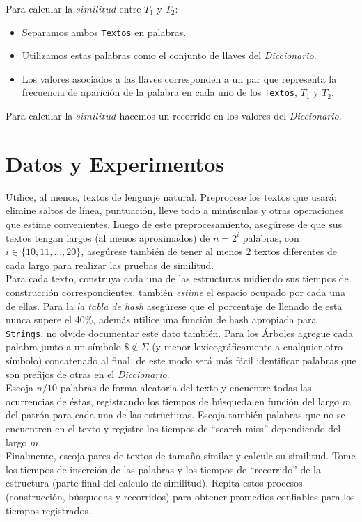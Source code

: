 \documentclass[dcc,uchile]{fcfmcourse}
\begin{document}
Para calcular la $similitud$ entre $T_{1}$ y $T_{2}$:
\begin{itemize}
\item Separamos ambos \texttt{Textos} en palabras.
\item Utilizamos estas palabras como el conjunto de llaves del \textit{Diccionario}.
\item Los valores asociados a las llaves corresponden a un par que representa la frecuencia de aparición de la palabra en cada uno de los \texttt{Textos}, $T_{1}$ y $T_{2}$.
\end{itemize}
Para calcular la $similitud$ hacemos un recorrido en los valores del \textit{Diccionario}.
\section{Datos y Experimentos}
Utilice, al menos, textos de lenguaje natural. Preprocese los textos que usará: elimine saltos de línea, puntuación, lleve todo a minúsculas y otras operaciones que estime convenientes. Luego de este preprocesamiento, asegúrese de que sus textos tengan largos (al menos aproximados) de $n = 2^i$ palabras, con $i \in \{10, 11, \ldots, 20\}$, asegúrese también de tener al menos $2$ textos diferentes de cada largo para realizar las pruebas de similitud.\\
Para cada texto, construya cada una de las estructuras midiendo sus tiempos de construcción correspondientes, también \textit{estime} el espacio ocupado por cada una de ellas. Para la \textit{la tabla de hash} asegúrese que el porcentaje de llenado de esta nunca supere el 40\%, además utilice una función de hash apropiada para \texttt{Strings}, no olvide documentar este dato también. Para los Árboles agregue cada palabra junto a un símbolo $\$ \not \in \Sigma$ (y menor lexicográficamente a cualquier otro símbolo) concatenado al final, de este modo será más fácil identificar palabras que son prefijos de otras en el \textit{Diccionario}. \\

Escoja $n/10$ palabras de forma aleatoria del texto y encuentre todas las ocurrencias de éstas, registrando los tiempos de búsqueda en función del largo $m$ del patrón para cada una de las estructuras. Escoja también palabras que no se encuentren en el texto y registre los tiempos de ``search miss'' dependiendo del largo $m$.\\
Finalmente, escoja pares de textos de tamaño similar y calcule su similitud. Tome los tiempos de inserción de las palabras y los tiempos de ``recorrido'' de la estructura (parte final del calculo de similitud). Repita estos procesos (construcción, búsquedas y recorridos) para obtener promedios confiables para los tiempos registrados.\\
\end{document}
